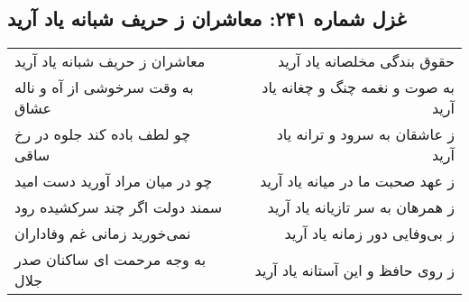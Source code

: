 \begin{center}
\section*{غزل شماره ۲۴۱: معاشران ز حریف شبانه یاد آرید}
\label{sec:sh241}
\begin{longtable}{l p{0.5cm} r}
معاشران ز حریف شبانه یاد آرید
&&
حقوق بندگی مخلصانه یاد آرید
\\
به وقت سرخوشی از آه و ناله عشاق
&&
به صوت و نغمه چنگ و چغانه یاد آرید
\\
چو لطف باده کند جلوه در رخ ساقی
&&
ز عاشقان به سرود و ترانه یاد آرید
\\
چو در میان مراد آورید دست امید
&&
ز عهد صحبت ما در میانه یاد آرید
\\
سمند دولت اگر چند سرکشیده رود
&&
ز همرهان به سر تازیانه یاد آرید
\\
نمی‌خورید زمانی غم وفاداران
&&
ز بی‌وفایی دور زمانه یاد آرید
\\
به وجه مرحمت ای ساکنان صدر جلال
&&
ز روی حافظ و این آستانه یاد آرید
\\
\end{longtable}
\end{center}
